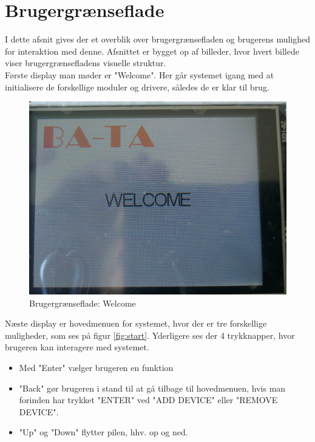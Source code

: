 \graphicspath{{Chapters/Userinterface/}}


\section{Brugergrænseflade}
I dette afsnit gives der et overblik over brugergrænsefladen og brugerens mulighed for interaktion med denne. Afsnittet er bygget op af billeder, hvor hvert billede viser brugergrænsefladens visuelle struktur. \\

Første display man møder er "Welcome". Her går systemet igang med at initialisere de forskellige moduler og drivere, således de er klar til brug.
\begin{figure}[H]
	\centering
	\includegraphics[width = 300 pt]{Img/welcome.jpg}
	\caption{Brugergrænseflade: Welcome}
	\label{fig:welcome}
\end{figure}

Næste display er hovedmenuen for systemet, hvor der er tre forskellige muligheder, som ses på figur     \ref{fig:start}. Yderligere ses der 4 trykknapper, hvor brugeren kan interagere med systemet.

\begin{itemize}  
	\item  Med "Enter" vælger brugeren en funktion
	\item "Back" gør brugeren i stand til at gå tilbage til hovedmenuen, hvis man forinden har trykket "ENTER" ved "ADD DEVICE" eller "REMOVE DEVICE".
	\item "Up" og "Down" flytter pilen, hhv. op og ned.
\end{itemize}

